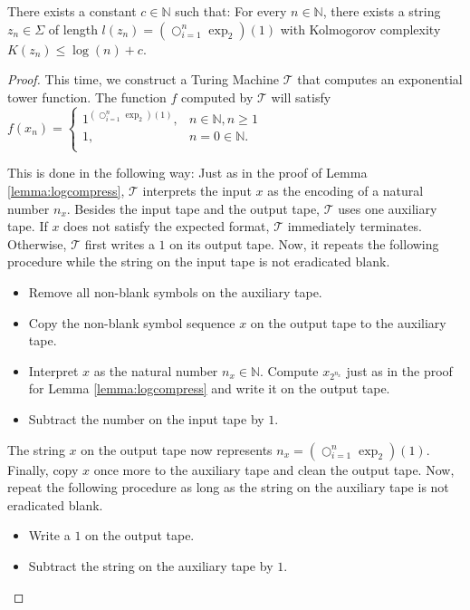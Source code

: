 \begin{lemma}
	\label{lemma:arbitrarycompress}
	There exists a constant $c\in\mathbb{N}$ such that:
	For every $n\in\mathbb{N}$, there exists a string $z_n\in\Sigma$ of length $l(z_n)=\left(\bigcirc_{i=1}^n \exp_2\right)(1)$ with Kolmogorov complexity $K(z_n)\leq \log (n) + c$.
\end{lemma}
\begin{proof}
	This time, we construct a Turing Machine $\mathcal{T}$ that computes an exponential tower function. 
	The function $f$ computed by $\mathcal{T}$ will satisfy $f(x_n)=\begin{cases}
		1^{\left(\bigcirc_{i=1}^n \exp_2\right)(1)}, & n\in\mathbb{N},n\geq 1\\
		1, & n=0\in\mathbb{N}.\\
	\end{cases}$
	
	This is done in the following way:
	Just as in the proof of Lemma \ref{lemma:logcompress}, $\mathcal{T}$ interprets the input $x$ as the encoding of a natural number $n_x$.
	Besides the input tape and the output tape, $\mathcal{T}$ uses one auxiliary tape. 
	If $x$ does not satisfy the expected format, $\mathcal{T}$ immediately terminates.
	Otherwise, $\mathcal{T}$ first writes a $1$ on its output tape.
	Now, it repeats the following procedure while the string on the input tape is not eradicated blank.
	\begin{itemize}
		\item Remove all non-blank symbols on the auxiliary tape.
		\item Copy the non-blank symbol sequence $x$ on the output tape to the auxiliary tape.
		\item Interpret $x$ as the natural number $n_x\in\mathbb{N}$. Compute $x_{2^{n_x}}$ just as in the proof for Lemma \ref{lemma:logcompress} and write it on the output tape.
		\item Subtract the number on the input tape by $1$.
	\end{itemize}
	
	The string $x$ on the output tape now represents $n_x=\left(\bigcirc_{i=1}^n \exp_2\right)(1)$.
	Finally, copy $x$ once more to the auxiliary tape and clean the output tape. 
	Now, repeat the following procedure as long as the string on the auxiliary tape is not eradicated blank.
	\begin{itemize}
		\item Write a $1$ on the output tape.
		\item Subtract the string on the auxiliary tape by $1$.
	\end{itemize}
	

\end{proof}
